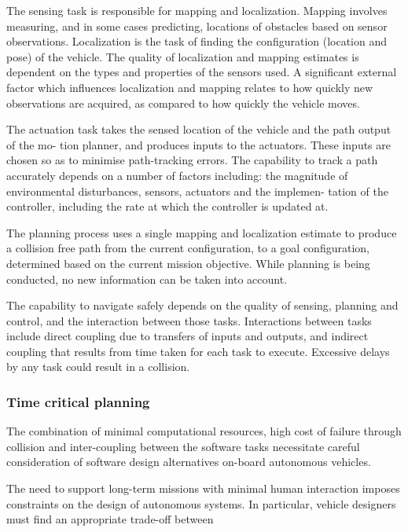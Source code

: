 The sensing task is responsible for mapping and localization. Mapping involves measuring,
and in some cases predicting, locations of obstacles based on sensor observations. Localization
is the task of finding the configuration (location and pose) of the vehicle. The quality of
localization and mapping estimates is dependent on the types and properties of the sensors
used. A significant external factor which influences localization and mapping relates to how
quickly new observations are acquired, as compared to how quickly the vehicle moves.

The actuation task takes the sensed location of the vehicle and the path output of the mo-
tion planner, and produces inputs to the actuators. These inputs are chosen so as to minimise
path-tracking errors. The capability to track a path accurately depends on a number of factors
including: the magnitude of environmental disturbances, sensors, actuators and the implemen-
tation of the controller, including the rate at which the controller is updated at.

The planning process uses a single mapping and localization estimate to produce a collision
free path from the current configuration, to a goal configuration, determined based on the
current mission objective. While planning is being conducted, no new information can be
taken into account.

The capability to navigate safely depends on the quality of sensing, planning and control,
and the interaction between those tasks. Interactions between tasks include direct coupling
due to transfers of inputs and outputs, and indirect coupling that results from time taken for
each task to execute. Excessive delays by any task could result in a collision.


\subsubsection{Time critical planning}
\label{time_critical_planning}

The combination of minimal computational resources, high cost of failure through collision
and inter-coupling between the software tasks necessitate careful consideration of software
design alternatives on-board autonomous vehicles.

The need to support long-term missions with minimal human interaction imposes constraints on the design of autonomous systems. 
In particular, vehicle designers must find an
appropriate trade-off between \cite{Walker2011}

